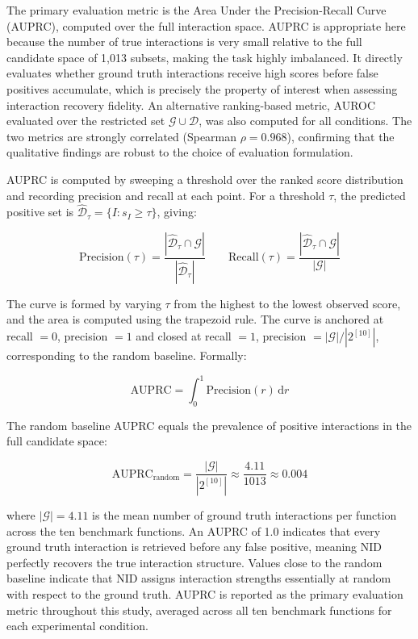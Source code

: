 \documentclass{article}
\begin{document}
The primary evaluation metric is the Area Under the Precision-Recall Curve 
(AUPRC), computed over the full interaction space. AUPRC is appropriate here
because the number of true interactions is very small relative to the full
candidate space of 1,013 subsets, making the task highly imbalanced. It
directly evaluates whether ground truth interactions receive high scores before
false positives accumulate, which is precisely the property of interest when
assessing interaction recovery fidelity. An alternative ranking-based metric,
AUROC evaluated over the restricted set $\mathcal{G} \cup \mathcal{D}$,
was also computed for all conditions.
The two metrics are strongly correlated (Spearman $\rho = 0.968$), confirming that the qualitative findings are robust to the choice of evaluation  formulation.

AUPRC is computed by sweeping a threshold over the ranked score distribution 
and recording precision and recall at each point. For a threshold $\tau$, 
the predicted positive set is $\hat{\mathcal{D}}_\tau = \{I : s_I \geq \tau\}$, 
giving:

\begin{equation}
    \text{Precision}(\tau) = 
    \frac{|\hat{\mathcal{D}}_\tau \cap \mathcal{G}|}{|\hat{\mathcal{D}}_\tau|}
    \qquad
    \text{Recall}(\tau) = 
    \frac{|\hat{\mathcal{D}}_\tau \cap \mathcal{G}|}{|\mathcal{G}|}
\end{equation}

\noindent The curve is formed by varying $\tau$ from the highest to the 
lowest observed score, and the area is computed using the trapezoid rule. 
The curve is anchored at recall $= 0$, precision $= 1$ and closed at 
recall $= 1$, precision $= |\mathcal{G}| / |2^{[10]}|$, corresponding to 
the random baseline. Formally:

\begin{equation}
    \text{AUPRC} = \int_0^1 \text{Precision}(r)\, \mathrm{d}r
    \label{eq:AUPRC}
\end{equation}

\noindent The random baseline AUPRC equals the prevalence of positive 
interactions in the full candidate space:

\begin{equation}
    \text{AUPRC}_{\text{random}} = \frac{|\mathcal{G}|}{|2^{[10]}|} 
    \approx \frac{4.11}{1013} \approx 0.004
\end{equation}

\noindent where $|\mathcal{G}| = 4.11$ is the mean number of ground truth 
interactions per function across the ten benchmark functions. An AUPRC of 
1.0 indicates that every ground truth interaction is retrieved before any 
false positive, meaning NID perfectly recovers the true interaction structure. 
Values close to the random baseline indicate that NID assigns interaction 
strengths essentially at random with respect to the ground truth. AUPRC is 
reported as the primary evaluation metric throughout this study, averaged 
across all ten benchmark functions for each experimental condition.
\end{document}

